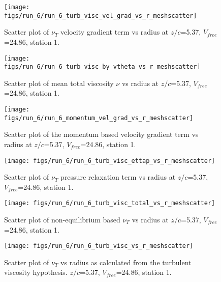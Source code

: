 \begin{figure}[H]
\centering
\texttt{[image: figs/run\_6/run\_6\_turb\_visc\_vel\_grad\_vs\_r\_meshscatter]}
\caption{Scatter plot of $\nu_T$ velocity gradient term vs radius at $z/c$=5.37, $V_{free}$=24.86, station 1.}
\end{figure}


\begin{figure}[H]
\centering
\texttt{[image: figs/run\_6/run\_6\_turb\_visc\_by\_vtheta\_vs\_r\_meshscatter]}
\caption{Scatter plot of mean total viscosity $\nu$ vs radius at $z/c$=5.37, $V_{free}$=24.86, station 1.}
\end{figure}


\begin{figure}[H]
\centering
\texttt{[image: figs/run\_6/run\_6\_momentum\_vel\_grad\_vs\_r\_meshscatter]}
\caption{Scatter plot of the momentum based velocity gradient term vs radius at $z/c$=5.37, $V_{free}$=24.86, station 1.}
\end{figure}


\begin{figure}[H]
\centering
\texttt{[image: figs/run\_6/run\_6\_turb\_visc\_ettap\_vs\_r\_meshscatter]}
\caption{Scatter plot of $\nu_T$ pressure relaxation term vs radius at $z/c$=5.37, $V_{free}$=24.86, station 1.}
\end{figure}


\begin{figure}[H]
\centering
\texttt{[image: figs/run\_6/run\_6\_turb\_visc\_total\_vs\_r\_meshscatter]}
\caption{Scatter plot of non-equilibrium based $\nu_T$ vs radius at $z/c$=5.37, $V_{free}$=24.86, station 1.}
\end{figure}


\begin{figure}[H]
\centering
\texttt{[image: figs/run\_6/run\_6\_turb\_visc\_vs\_r\_meshscatter]}
\caption{Scatter plot of $\nu_T$ vs radius as calculated from the turbulent viscosity hypothesis. $z/c$=5.37, $V_{free}$=24.86, station 1.}
\end{figure}


